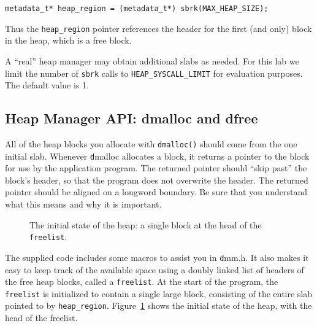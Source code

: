 \documentclass[a4paper,10pt]{article}
\newcommand{\comment}[1]{}
\begin{document}
\begin{lstlisting}
metadata_t* heap_region = (metadata_t*) sbrk(MAX_HEAP_SIZE);
\end{lstlisting} 

Thus the \texttt{heap\_region} pointer references the header for
the first (and only) block in the heap, which is a free block.

A ``real'' heap manager may obtain additional slabs as needed.  For
this lab we limit the number of \texttt{sbrk} calls to
\texttt{HEAP\_SYSCALL\_LIMIT} for evaluation purposes.  The default
value is 1.

\subsection{Heap Manager API: dmalloc and dfree}

All of the heap blocks you allocate with
\texttt{dmalloc()} should come from the one initial slab.
Whenever {\texttt dmalloc} allocates
a block, it returns a pointer to the block for use by the application
program.  The returned pointer should ``skip past'' the block's header, so
that the program does not overwrite the header.  The returned pointer
should be 
aligned on a longword boundary.  Be sure that you understand what this means and why it is
important.


\begin{figure}[!ht]
\centering
{}\hspace{2mm}\hspace{1mm}
\caption{The initial state of the heap: a single block at the head of the \texttt{freelist}.  }
\label{fig:freelist}
\end{figure}

The supplied code includes some macros to assist you in {\texttt dmm.h}.
It also makes it easy to keep track of the
available space using  a doubly linked list of headers of
the free heap blocks, called a \texttt{freelist}.
At the start of the program, the \texttt{freelist} is initialized to
contain a single large block, consisting of the entire slab pointed to
by \texttt{heap\_region}.
Figure~\ref{fig:freelist} shows the initial state of the heap, with the head of the freelist.


\comment{
See Bryant and O'Hallaron~\cite{Bryant}, Chapter 9 for more
efficient structure. You are encouraged to improve the metadata structure for 
better efficiency. In addition, you can earn extra credit for implementing all the 
operations in constant time, i.e., O(1).
}
\end{document}
